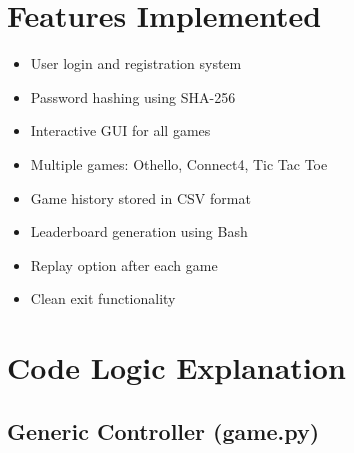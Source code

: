 \documentclass[12pt]{article}
\begin{document}
\section{Features Implemented}

\begin{itemize}
    \item User login and registration system
    \item Password hashing using SHA-256
    \item Interactive GUI for all games
    \item Multiple games: Othello, Connect4, Tic Tac Toe
    \item Game history stored in CSV format
    \item Leaderboard generation using Bash
    \item Replay option after each game
    \item Clean exit functionality
\end{itemize}

\section{Code Logic Explanation}

\subsection{Generic Controller (game.py)}
\end{document}
